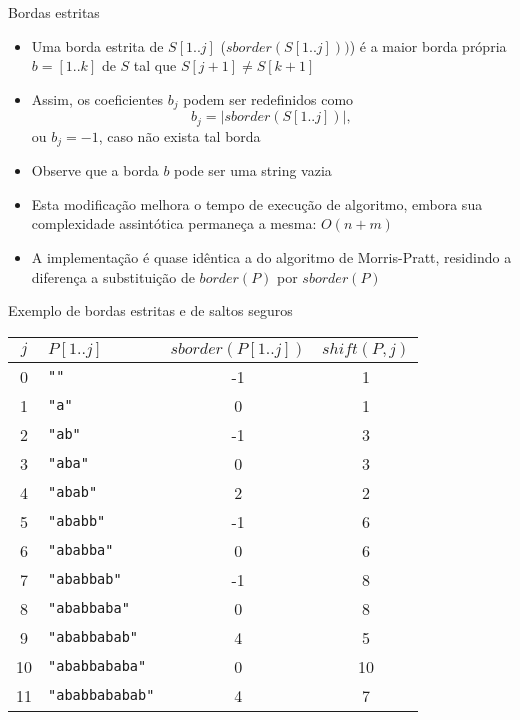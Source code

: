 \begin{frame}[fragile]{Bordas estritas}

    \begin{itemize}
        \item Uma borda estrita de $S[1..j]$ ($sborder(S[1..j]))$) é a maior borda própria 
            $b = [1..k]$ de $S$ tal que $S[j + 1] \neq S[k + 1]$

        \item Assim, os coeficientes $b_j$ podem ser redefinidos como
        \[
            b_j = |sborder(S[1..j])|,
        \]
        ou $b_j = -1$, caso não exista tal borda

        \item Observe que a borda $b$ pode ser uma string vazia

        \item Esta modificação melhora o tempo de execução de algoritmo, embora sua 
            complexidade assintótica permaneça a mesma: $O(n + m)$

        \item A implementação é quase idêntica a do algoritmo de Morris-Pratt, residindo a 
            diferença a substituição de $border(P)$ por $sborder(P)$

    \end{itemize}

\end{frame}

\begin{frame}[fragile]{Exemplo de bordas estritas e de saltos seguros}

    \begin{center}
    \begin{tabularx}{0.9\textwidth}{cXcc}
        \toprule
        $j$ & $P[1..j]$ & $sborder(P[1..j])$ & $shift(P, j)$ \\
        \midrule
            0&\textcolor{red!70}{\verb|""|}&-1&1\\
            1&\textcolor{red!70}{\verb|"a"|}&0&1\\
            2&\textcolor{red!70}{\verb|"ab"|}&-1&3\\
            3&\textcolor{red!70}{\verb|"aba"|}&0&3\\
            4&\textcolor{red!70}{\verb|"abab"|}&2&2\\
            5&\textcolor{red!70}{\verb|"ababb"|}&-1&6\\
            6&\textcolor{red!70}{\verb|"ababba"|}&0&6\\
            7&\textcolor{red!70}{\verb|"ababbab"|}&-1&8\\
            8&\textcolor{red!70}{\verb|"ababbaba"|}&0&8\\
            9&\textcolor{red!70}{\verb|"ababbabab"|}&4&5\\
            10&\textcolor{red!70}{\verb|"ababbababa"|}&0&10\\
            11&\textcolor{red!70}{\verb|"ababbababab"|}&4&7\\
        \bottomrule
    \end{tabularx}
    \end{center}

\end{frame}

